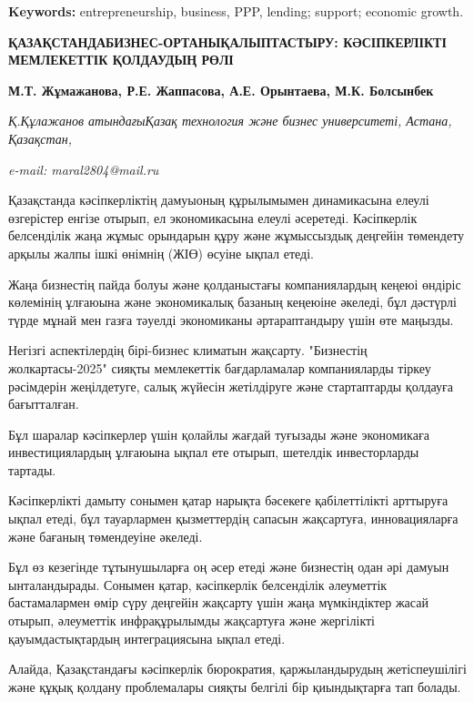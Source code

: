 {\bfseries Keywords:} entrepreneurship, business, PPP, lending; support;
economic growth.

\begin{articleheader}
{\bfseries ҚАЗАҚСТАНДАБИЗНЕС-ОРТАНЫҚАЛЫПТАСТЫРУ: КӘСІПКЕРЛІКТІ МЕМЛЕКЕТТІК ҚОЛДАУДЫҢ РӨЛІ}

{\bfseries
М.Т. Жұмажанова\textsuperscript{\envelope },
Р.Е. Жаппасова,
А.Е. Орынтаева,
М.К. Болсынбек}
\end{articleheader}

\begin{affiliation}
\emph{Қ.Құлажанов атындағыҚазақ технология және бизнес университеті, Астана, Қазақстан,}

\emph{e-mail: maral2804@mail.ru}
\end{affiliation}

Қазақстанда кәсіпкерліктің дамуыоның құрылымымен динамикасына елеулі
өзгерістер енгізе отырып, ел экономикасына елеулі әсеретеді. Кәсіпкерлік
белсенділік жаңа жұмыс орындарын құру және жұмыссыздық деңгейін
төмендету арқылы жалпы ішкі өнімнің (ЖІӨ) өсуіне ықпал етеді.

Жаңа бизнестің пайда болуы және қолданыстағы компаниялардың кеңеюі
өндіріс көлемінің ұлғаюына және экономикалық базаның кеңеюіне әкеледі,
бұл дәстүрлі түрде мұнай мен газға тәуелді экономиканы әртараптандыру
үшін өте маңызды.

Негізгі аспектілердің бірі-бизнес климатын жақсарту. "Бизнестің
жолкартасы-2025" сияқты мемлекеттік бағдарламалар компанияларды тіркеу
рәсімдерін жеңілдетуге, салық жүйесін жетілдіруге және стартаптарды
қолдауға бағытталған.

Бұл шаралар кәсіпкерлер үшін қолайлы жағдай туғызады және экономикаға
инвестициялардың ұлғаюына ықпал ете отырып, шетелдік инвесторларды
тартады.

Кәсіпкерлікті дамыту сонымен қатар нарықта бәсекеге қабілеттілікті
арттыруға ықпал етеді, бұл тауарлармен қызметтердің сапасын жақсартуға,
инновацияларға және бағаның төмендеуіне әкеледі.

Бұл өз кезегінде тұтынушыларға оң әсер етеді және бизнестің одан әрі
дамуын ынталандырады. Сонымен қатар, кәсіпкерлік белсенділік әлеуметтік
бастамалармен өмір сүру деңгейін жақсарту үшін жаңа мүмкіндіктер жасай
отырып, әлеуметтік инфрақұрылымды жақсартуға және жергілікті
қауымдастықтардың интеграциясына ықпал етеді.

Алайда, Қазақстандағы кәсіпкерлік бюрократия, қаржыландырудың
жетіспеушілігі және құқық қолдану проблемалары сияқты белгілі бір
қиындықтарға тап болады.

